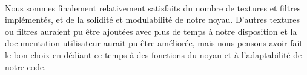 \documentclass[a4paper]{article}
\begin{document}
\paragraph{}
Nous sommes finalement relativement satisfaits du nombre de textures et filtres implémentés, et de la solidité et modulabilité de notre noyau. D'autres textures ou filtres auraient pu être ajoutées avec plus de temps à notre disposition et la documentation utilisateur aurait pu être améliorée, mais nous pensons avoir fait le bon choix en dédiant ce temps à des fonctions du noyau et à l'adaptabilité de notre code.




\end{document}
